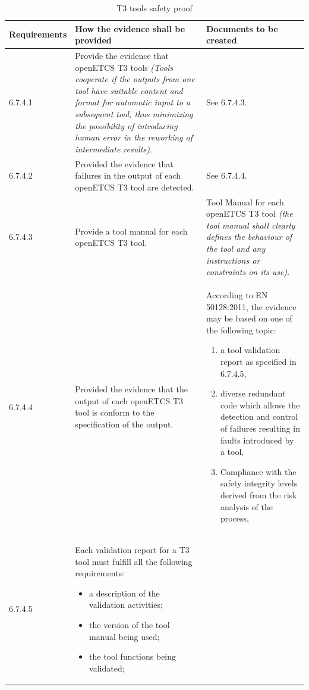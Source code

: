 \documentclass{template/openetcs_report}
\begin{document}
{\footnotesize\sffamily\centering
\begin{longtable}{|p{2cm}|p{9cm}|p{3cm}|}
\caption{T3 tools safety proof}\\
\hline
\bfseries Requirements & \bfseries How the evidence shall be provided & \bfseries Documents to be created\\
\hline
\hline
\endhead
\hline
\endfoot

6.7.4.1 & Provide the evidence that openETCS T3 tools \linebreak \linebreak \textit{(Tools cooperate if the outputs from one tool have suitable content and format for automatic input to a subsequent tool, thus minimizing the possibility of introducing human error in the reworking of intermediate results)}. & See 6.7.4.3.\\ 
\hline
6.7.4.2 & Provided the evidence that failures in the output of each openETCS T3 tool are detected. & See 6.7.4.4.\\ 
\hline
6.7.4.3 & Provide a tool manual for each openETCS T3 tool. & Tool Manual for each openETCS T3 tool \linebreak \linebreak \textit{(the tool manual shall clearly defines the behaviour of the tool and any instructions or constraints on its use)}.\\
\hline
6.7.4.4 & Provided the evidence that the output of each openETCS T3 tool is conform to the specification of the output.& 
According to EN 50128:2011, the evidence may be based on one of the following topic:
\begin{enumerate}\itemsep=0pt
  \item a tool validation report as specified in 6.7.4.5,
  \item diverse redundant code which allows the detection and control of failures resulting in faults introduced by a tool,
  \item Compliance with the safety integrity levels derived from the risk analysis of the process,
\end{enumerate}\\ 
\hline
6.7.4.5 & Each validation report for a T3 tool must fulfill all the following requirements:
\begin{itemize}\itemsep=0pt
  \item a description of the validation activities;
  \item the version of the tool manual being used;
  \item the tool functions being validated;

\end{itemize}
\end{longtable}}
\end{document}
